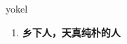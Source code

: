 
\begin{frame}
{\huge yokel}
\begin{center}
\begin{enumerate}\Large
  \item \textbf{乡下人，天真纯朴的人}
\end{enumerate}
\end{center}
\end{frame}
